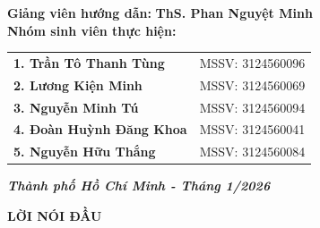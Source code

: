 \documentclass[14pt, a4paper]{extarticle}
\begin{document}
\begin{titlepage}
    \hspace{1cm}
    \begin{minipage}{0.9\textwidth}
        \rmfamily %
        \fontsize{13}{16}\selectfont
        \color{black}
        
        \textbf{\color{sgublue}Giảng viên hướng dẫn:} \textbf{ThS. Phan Nguyệt Minh} \\[0.8cm]
        \textbf{\color{sgublue}Nhóm sinh viên thực hiện:} \\[0.2cm]
        \begin{tabular}{@{}ll@{}}
            \textbf{1. Trần Tô Thanh Tùng} & \hspace{1cm} MSSV: 3124560096 \\
            \textbf{2. Lương Kiện Minh} & \hspace{1cm} MSSV: 3124560069 \\
            \textbf{3. Nguyễn Minh Tú} & \hspace{1cm} MSSV: 3124560094 \\
            \textbf{4. Đoàn Huỳnh Đăng Khoa} & \hspace{1cm} MSSV: 3124560041 \\
            \textbf{5. Nguyễn Hữu Thắng} & \hspace{1cm} MSSV: 3124560084 \\
        \end{tabular}
    \end{minipage}

    \vspace{1cm}

    \begin{center}
        \rmfamily
        \fontsize{13}{16}\selectfont
        \textit{\textbf{Thành phố Hồ Chí Minh - Tháng 1/2026}}
    \end{center}

\end{titlepage}
\newpage\thispagestyle{empty}\mbox{}\newpage
\begin{center}
    \textbf{\fontsize{16}{19.2}\selectfont LỜI NÓI ĐẦU}
\end{center}
\vspace{0.5cm}
\end{document}
